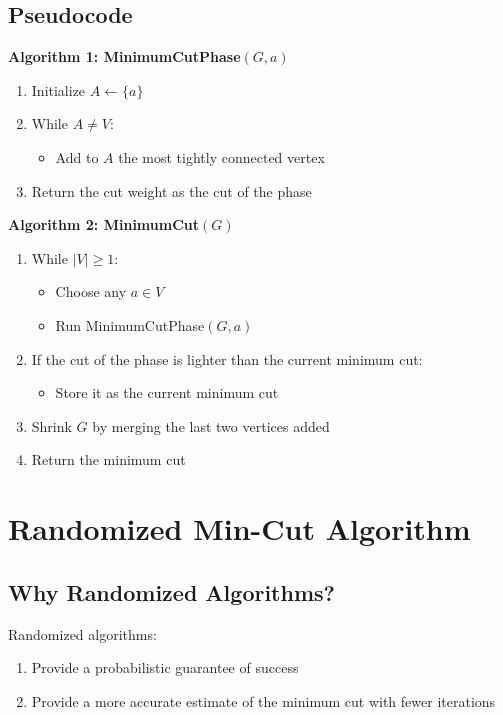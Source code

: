 \documentclass[12pt]{article}
\begin{document}
\subsection{Pseudocode}

\textbf{Algorithm 1: MinimumCutPhase$(G, a)$}

\begin{enumerate}
    \item Initialize $A \leftarrow \{a\}$
    \item While $A \neq V$:
    \begin{itemize}
        \item Add to $A$ the most tightly connected vertex
    \end{itemize}
    \item Return the cut weight as the cut of the phase
\end{enumerate}

\textbf{Algorithm 2: MinimumCut$(G)$}

\begin{enumerate}
    \item While $|V| \ge 1$:
    \begin{itemize}
        \item Choose any $a \in V$
        \item Run MinimumCutPhase$(G, a)$
    \end{itemize}
    \item If the cut of the phase is lighter than the current minimum cut:
    \begin{itemize}
        \item Store it as the current minimum cut
    \end{itemize}
    \item Shrink $G$ by merging the last two vertices added
    \item Return the minimum cut
\end{enumerate}

\section{Randomized Min-Cut Algorithm}

\subsection{Why Randomized Algorithms?}

Randomized algorithms:
\begin{enumerate}
    \item Provide a probabilistic guarantee of success
    \item Provide a more accurate estimate of the minimum cut with fewer iterations
\end{enumerate}
\end{document}
